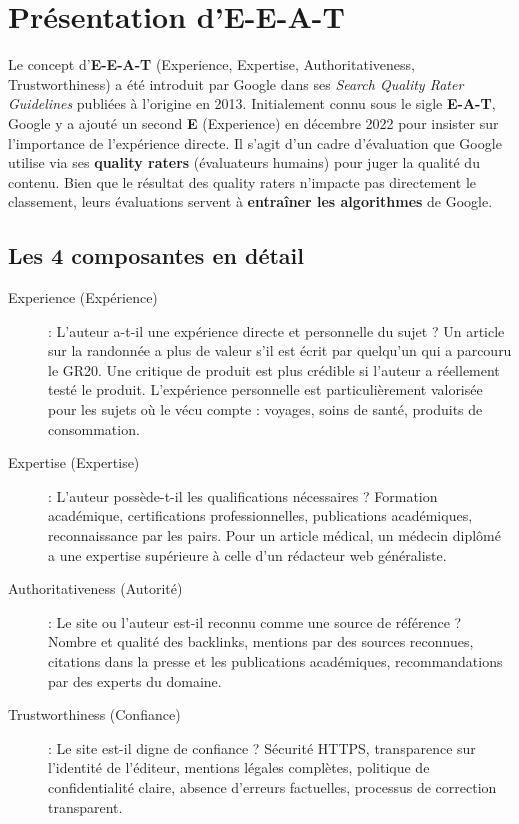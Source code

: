 \documentclass[12pt,a4paper,twoside]{report}
\newcommand{\keyword}[1]{\textbf{\textcolor{googleblue}{#1}}}
\begin{document}
\section{Présentation d'E-E-A-T}

Le concept d'\keyword{E-E-A-T} (Experience, Expertise, Authoritativeness, Trustworthiness) a été introduit par Google dans ses \textit{Search Quality Rater Guidelines} publiées à l'origine en 2013. Initialement connu sous le sigle \keyword{E-A-T}, Google y a ajouté un second \textbf{E} (Experience) en décembre 2022 pour insister sur l'importance de l'expérience directe. Il s'agit d'un cadre d'évaluation que Google utilise via ses \keyword{quality raters} (évaluateurs humains) pour juger la qualité du contenu. Bien que le résultat des quality raters n'impacte pas directement le classement, leurs évaluations servent à \textbf{entraîner les algorithmes} de Google.

\subsection{Les 4 composantes en détail}

\begin{description}
    \item[Experience (Expérience)] : L'auteur a-t-il une expérience directe et personnelle du sujet ? Un article sur la randonnée a plus de valeur s'il est écrit par quelqu'un qui a parcouru le GR20. Une critique de produit est plus crédible si l'auteur a réellement testé le produit. L'expérience personnelle est particulièrement valorisée pour les sujets où le vécu compte : voyages, soins de santé, produits de consommation.
    \item[Expertise (Expertise)] : L'auteur possède-t-il les qualifications nécessaires ? Formation académique, certifications professionnelles, publications académiques, reconnaissance par les pairs. Pour un article médical, un médecin diplômé a une expertise supérieure à celle d'un rédacteur web généraliste.
    \item[Authoritativeness (Autorité)] : Le site ou l'auteur est-il reconnu comme une source de référence ? Nombre et qualité des backlinks, mentions par des sources reconnues, citations dans la presse et les publications académiques, recommandations par des experts du domaine.
    \item[Trustworthiness (Confiance)] : Le site est-il digne de confiance ? Sécurité HTTPS, transparence sur l'identité de l'éditeur, mentions légales complètes, politique de confidentialité claire, absence d'erreurs factuelles, processus de correction transparent.
\end{description}
\end{document}
